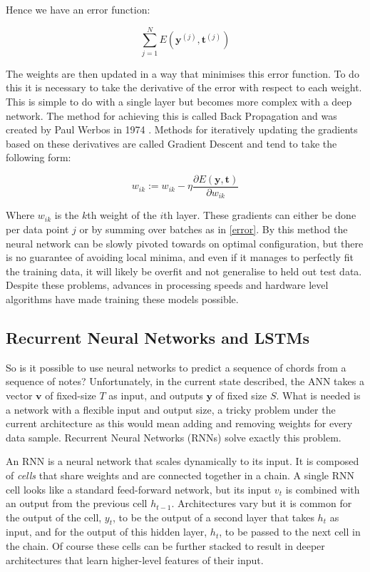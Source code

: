 \documentclass[bsc,singlespacing,logo, parskip, deptreport]{infthesis}
\begin{document}
Hence we have an error function:

\begin{equation}
  \label{error}
  \sum_{j = 1}^{N} E(\bm{y}^{(j)}, \bm{t}^{(j)})
\end{equation}

The weights are then updated in a way that minimises this error function. To do this it is necessary to take the derivative of the error with respect to each weight. This is simple to do with a single layer but becomes more complex with a deep network. The method for achieving this is called Back Propagation and was created by Paul Werbos in 1974 \cite{werbos_1974}. Methods for iteratively updating the gradients based on these derivatives are called Gradient Descent and tend to take the following form:

\begin{equation}
  w_{ik} := w_{ik} - \eta \frac{\partial E(\bm{y}, \bm{t})}{\partial w_{ik}}
\end{equation}

Where $w_{ik}$ is the $k$th weight of the $i$th layer. These gradients can either be done per data point $j$ or by summing over batches as in \ref{error}. By this method the neural network can be slowly pivoted towards on optimal configuration, but there is no guarantee of avoiding local minima, and even if it manages to perfectly fit the training data, it will likely be overfit and not generalise to held out test data. Despite these problems, advances in processing speeds and hardware level algorithms \cite{kruger2003linear} have made training these models possible.

\subsection{Recurrent Neural Networks and LSTMs}

So is it possible to use neural networks to predict a sequence of chords from a sequence of notes? Unfortunately, in the current state described, the ANN takes a vector $\bm{v}$ of fixed-size $T$ as input, and outputs $\bm{y}$ of fixed size $S$. What is needed is a network with a flexible input and output size, a tricky problem under the current architecture as this would mean adding and removing weights for every data sample. Recurrent Neural Networks (RNNs) solve exactly this problem.

An RNN is a neural network that scales dynamically to its input. It is composed of {\em cells} that share weights and are connected together in a chain. A single RNN cell looks like a standard feed-forward network, but its input $v_t$ is combined with an output from the previous cell $h_{t-1}$. Architectures vary but it is common for the output of the cell, $y_t$, to be the output of a second layer that takes $h_t$ as input, and for the output of this hidden layer, $h_t$, to be passed to the next cell in the chain. Of course these cells can be further stacked to result in deeper architectures that learn higher-level features of their input.
\end{document}
